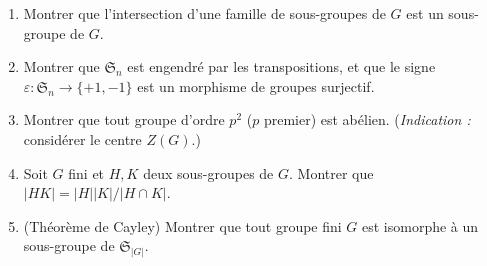 \vspace{6pt}
\exolabel

\begin{mdframed}[style=exobar]
  \begin{enumerate}
    \item Montrer que l'intersection d'une famille de sous-groupes de $G$
          est un sous-groupe de $G$.

    \item Montrer que $\mathfrak{S}_n$ est engendré par les transpositions,
          et que le signe $\varepsilon : \mathfrak{S}_n \to \{+1,-1\}$
          est un morphisme de groupes surjectif.

    \item Montrer que tout groupe d'ordre $p^2$ ($p$ premier) est abélien.
          (\textit{Indication :} considérer le centre $Z(G)$.)

    \item Soit $G$ fini et $H, K$ deux sous-groupes de $G$. Montrer que
          $|HK| = |H||K|/|H\cap K|$.

    \item (Théorème de Cayley) Montrer que tout groupe fini $G$ est
          isomorphe à un sous-groupe de $\mathfrak{S}_{|G|}$.
  \end{enumerate}
\end{mdframed}

